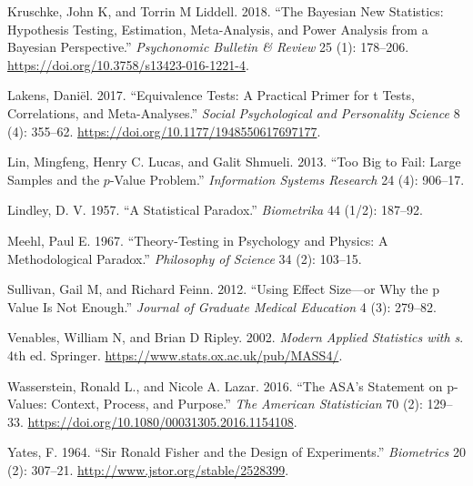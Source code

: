 \documentclass[
  11pt,
  letterpaper,
]{article}
\newlength{\cslhangindent}
\newenvironment{CSLReferences}[2] %
 {\begin{list}{}{%
  \setlength{\itemindent}{0pt}
  \setlength{\leftmargin}{0pt}
  \setlength{\parsep}{0pt}
  \ifodd #1
   \setlength{\leftmargin}{\cslhangindent}
   \setlength{\itemindent}{-1\cslhangindent}
  \fi
  \setlength{\itemsep}{#2\baselineskip}}}
 {\end{list}}
\begin{document}
\begin{CSLReferences}{1}{1}
Kruschke, John K, and Torrin M Liddell. 2018. {``The Bayesian New
Statistics: Hypothesis Testing, Estimation, Meta-Analysis, and Power
Analysis from a Bayesian Perspective.''} \emph{Psychonomic Bulletin \&
Review} 25 (1): 178--206.
\url{https://doi.org/10.3758/s13423-016-1221-4}.

Lakens, Daniël. 2017. {``Equivalence Tests: A Practical Primer for t
Tests, Correlations, and Meta-Analyses.''} \emph{Social Psychological
and Personality Science} 8 (4): 355--62.
\url{https://doi.org/10.1177/1948550617697177}.

Lin, Mingfeng, Henry C. Lucas, and Galit Shmueli. 2013. {``Too Big to
Fail: Large Samples and the \(p\)-Value Problem.''} \emph{Information
Systems Research} 24 (4): 906--17.

Lindley, D. V. 1957. {``A Statistical Paradox.''} \emph{Biometrika} 44
(1/2): 187--92.

Meehl, Paul E. 1967. {``Theory-Testing in Psychology and Physics: A
Methodological Paradox.''} \emph{Philosophy of Science} 34 (2): 103--15.

Sullivan, Gail M, and Richard Feinn. 2012. {``Using Effect Size---or Why
the p Value Is Not Enough.''} \emph{Journal of Graduate Medical
Education} 4 (3): 279--82.

Venables, William N, and Brian D Ripley. 2002. \emph{Modern Applied
Statistics with s}. 4th ed. Springer.
\url{https://www.stats.ox.ac.uk/pub/MASS4/}.

Wasserstein, Ronald L., and Nicole A. Lazar. 2016. {``The ASA's
Statement on p-Values: Context, Process, and Purpose.''} \emph{The
American Statistician} 70 (2): 129--33.
\url{https://doi.org/10.1080/00031305.2016.1154108}.

Yates, F. 1964. {``Sir Ronald Fisher and the Design of Experiments.''}
\emph{Biometrics} 20 (2): 307--21.
\url{http://www.jstor.org/stable/2528399}.

\end{CSLReferences}
\end{document}

